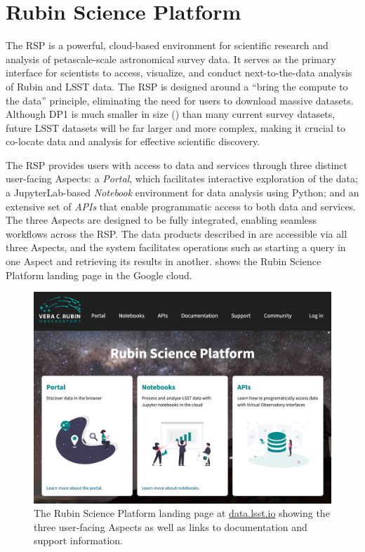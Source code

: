 \section{Rubin Science Platform}
\label{sec:data_services}

The \gls{RSP} \citep{LSE-319} is a powerful, cloud-based environment for scientific research and analysis of petascale-scale astronomical survey data.
It serves as the primary interface for scientists to access, visualize, and conduct next-to-the-data analysis of Rubin and \gls{LSST} data.
The  \gls{RSP} is designed around a  ``bring the compute to the data'' principle, eliminating the need for users to download massive datasets.
Although \gls{DP1} is much smaller in size (\sizeinbytes) than many current survey datasets, future \gls{LSST} datasets will be far larger and more complex, making it crucial to co-locate data and analysis for effective scientific discovery.

The \gls{RSP} provides users with access to data and services through three distinct user-facing Aspects: a \emph{Portal}, which facilitates interactive exploration of the data; a JupyterLab-based \emph{Notebook} environment for data analysis using Python; and an extensive set of \emph{\glspl{API}} that enable programmatic access to both data and services.
The three Aspects are designed to be fully integrated, enabling seamless workflows across the \gls{RSP}.
The data products described in  are accessible via all three Aspects, and the system facilitates operations such as starting a query in one Aspect and retrieving its results in another.
 shows the Rubin \gls{Science Platform} landing page in the Google cloud.
\begin{figure}[htb!]
\centering
\includegraphics[width=0.98\linewidth]{rsp_landing_page}
\caption{The Rubin Science Platform landing page at \url{data.lsst.io} showing the three user-facing Aspects as well as links to documentation and support information.}
\label{fig:rsp_landing_page}
\vspace{0.1cm}
\end{figure}

